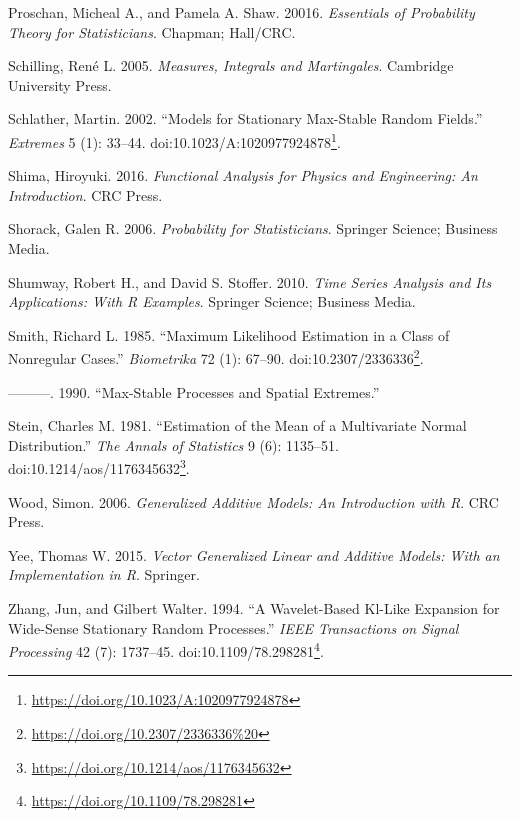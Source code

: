 \documentclass[b5paper,]{book}
\let\rmarkdownfootnote\footnote%
\def\footnote{\protect\rmarkdownfootnote}
\renewcommand{\href}[2]{#2\footnote{\url{#1}}}
\theoremstyle{definition}
\theoremstyle{definition}
\theoremstyle{definition}
\theoremstyle{remark}
\begin{document}
\hypertarget{ref-Proschan2016}{}
Proschan, Micheal A., and Pamela A. Shaw. 20016. \emph{Essentials of
Probability Theory for Statisticians}. Chapman; Hall/CRC.

\hypertarget{ref-Schilling2005}{}
Schilling, René L. 2005. \emph{Measures, Integrals and Martingales}.
Cambridge University Press.

\hypertarget{ref-Schlather2002}{}
Schlather, Martin. 2002. ``Models for Stationary Max-Stable Random
Fields.'' \emph{Extremes} 5 (1): 33--44.
doi:\href{https://doi.org/10.1023/A:1020977924878}{10.1023/A:1020977924878}.

\hypertarget{ref-Shima2016}{}
Shima, Hiroyuki. 2016. \emph{Functional Analysis for Physics and
Engineering: An Introduction}. CRC Press.

\hypertarget{ref-Shorack2006}{}
Shorack, Galen R. 2006. \emph{Probability for Statisticians}. Springer
Science; Business Media.

\hypertarget{ref-Shumway2010}{}
Shumway, Robert H., and David S. Stoffer. 2010. \emph{Time Series
Analysis and Its Applications: With R Examples}. Springer Science;
Business Media.

\hypertarget{ref-Smith1985}{}
Smith, Richard L. 1985. ``Maximum Likelihood Estimation in a Class of
Nonregular Cases.'' \emph{Biometrika} 72 (1): 67--90.
doi:\href{https://doi.org/10.2307/2336336\%20}{10.2307/2336336}.

\hypertarget{ref-Smith1990}{}
---------. 1990. ``Max-Stable Processes and Spatial Extremes.''

\hypertarget{ref-Stein1981}{}
Stein, Charles M. 1981. ``Estimation of the Mean of a Multivariate
Normal Distribution.'' \emph{The Annals of Statistics} 9 (6): 1135--51.
doi:\href{https://doi.org/10.1214/aos/1176345632}{10.1214/aos/1176345632}.

\hypertarget{ref-Wood2006}{}
Wood, Simon. 2006. \emph{Generalized Additive Models: An Introduction
with R}. CRC Press.

\hypertarget{ref-Yee2015}{}
Yee, Thomas W. 2015. \emph{Vector Generalized Linear and Additive
Models: With an Implementation in R}. Springer.

\hypertarget{ref-Zhang1994}{}
Zhang, Jun, and Gilbert Walter. 1994. ``A Wavelet-Based Kl-Like
Expansion for Wide-Sense Stationary Random Processes.'' \emph{IEEE
Transactions on Signal Processing} 42 (7): 1737--45.
doi:\href{https://doi.org/10.1109/78.298281}{10.1109/78.298281}.

\backmatter
\printindex
\end{document}
